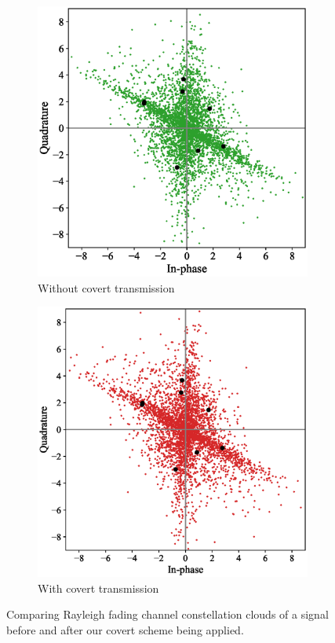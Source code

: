 \begin{figure}[tp!]
	\begin{subfigure}{0.24\textwidth}
		\includegraphics[width=\linewidth]{figs/rayleigh_normal_constellation}
		\caption{Without covert transmission}
	\end{subfigure}
	\hfill
	\begin{subfigure}{0.24\textwidth}
		\includegraphics[width=\linewidth]{figs/rayleigh_covert_constellation}
		\caption{With covert transmission}	
	\end{subfigure}
	\caption{Comparing Rayleigh fading channel constellation clouds of a signal before and after our covert scheme being applied.}
	\label{fig:rayleigh_constellation}
\end{figure}
